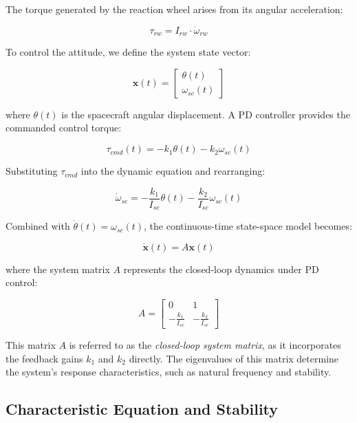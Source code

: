 \documentclass{ifacconf}
\begin{document}
The torque generated by the reaction wheel arises from its angular acceleration:

\begin{equation}
\tau_{rw} = I_{rw} \cdot \dot{\omega}_{rw}
\end{equation}

To control the attitude, we define the system state vector:

\begin{equation}
\mathbf{x}(t) = \begin{bmatrix} \theta(t) \\ \omega_{sc}(t) \end{bmatrix}
\end{equation}

where $\theta(t)$ is the spacecraft angular displacement. A PD controller provides the commanded control torque:

\begin{equation}
\tau_{cmd}(t) = -k_1 \theta(t) - k_2 \omega_{sc}(t)
\end{equation}

Substituting $\tau_{cmd}$ into the dynamic equation and rearranging:

\begin{equation}
\dot{\omega}_{sc} = -\frac{k_1}{I_{sc}} \theta(t) - \frac{k_2}{I_{sc}} \omega_{sc}(t)
\end{equation}

Combined with $\dot{\theta}(t) = \omega_{sc}(t)$, the continuous-time state-space model becomes:

\begin{equation}
\dot{\mathbf{x}}(t) = A \mathbf{x}(t)
\end{equation}

where the system matrix $A$ represents the closed-loop dynamics under PD control:

\begin{equation}
A = \begin{bmatrix} 
0 & 1 \\ 
-\frac{k_1}{I_{sc}} & -\frac{k_2}{I_{sc}} 
\end{bmatrix}
\end{equation}

This matrix $A$ is referred to as the \textit{closed-loop system matrix}, as it incorporates the feedback gains $k_1$ and $k_2$ directly. The eigenvalues of this matrix determine the system’s response characteristics, such as natural frequency and stability.

\subsection{Characteristic Equation and Stability}
\end{document}
